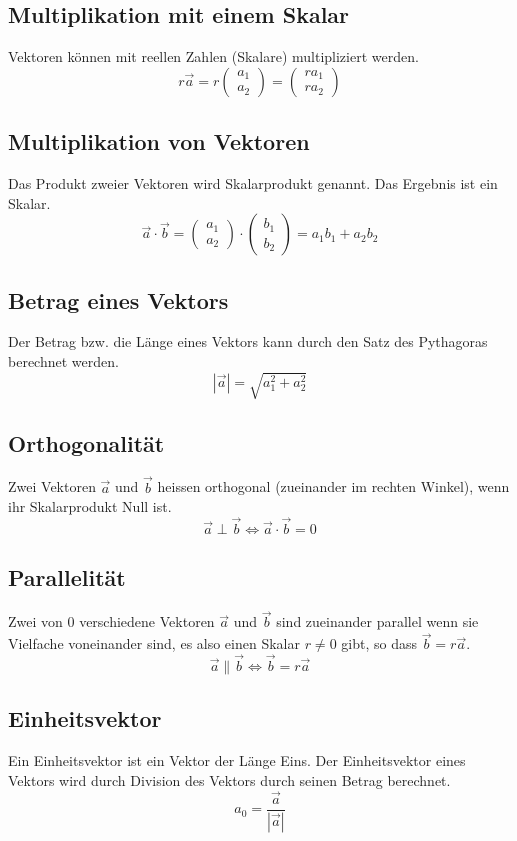 \documentclass[a4paper]{article}
\begin{document}
\subsection{Multiplikation mit einem Skalar}
Vektoren können mit reellen Zahlen (Skalare) multipliziert werden.
\[
r\vec a=r\begin{pmatrix}a_1\\a_2 \end{pmatrix}=\begin{pmatrix}ra_1\\ra_2 \end{pmatrix}
\]
\subsection{Multiplikation von Vektoren}
Das Produkt zweier Vektoren wird Skalarprodukt genannt. Das Ergebnis ist ein Skalar.
\[
\vec a \cdot \vec b=\begin{pmatrix}a_1\\a_2 \end{pmatrix} \cdot \begin{pmatrix}b_1\\b_2 \end{pmatrix}=a_1b_1+a_2b_2
\]
\subsection{Betrag eines Vektors}
Der Betrag bzw. die Länge eines Vektors kann durch den Satz des Pythagoras berechnet werden.
\[
|\vec a| = \sqrt{a_1^2 + a_2^2}
\]
\subsection{Orthogonalität}
Zwei Vektoren $\vec a$ und $\vec b$ heissen orthogonal (zueinander im rechten Winkel), wenn ihr Skalarprodukt Null ist.
\[
\vec a \perp \vec b \Leftrightarrow \vec a \cdot \vec b = 0
\]
\subsection{Parallelität}
Zwei von 0 verschiedene Vektoren $\vec a$ und $\vec b$ sind zueinander parallel wenn sie Vielfache voneinander sind, es also einen Skalar $r \neq 0$ gibt, so dass $\vec b = r\vec a$.
\[
\vec a \parallel \vec b \Leftrightarrow \vec b = r \vec a
\]
\subsection{Einheitsvektor}
Ein Einheitsvektor ist ein Vektor der Länge Eins. Der Einheitsvektor eines Vektors wird durch Division des Vektors durch seinen Betrag berechnet.
\[
a_0 = \frac{\vec a}{|\vec a|}
\]
\end{document}
